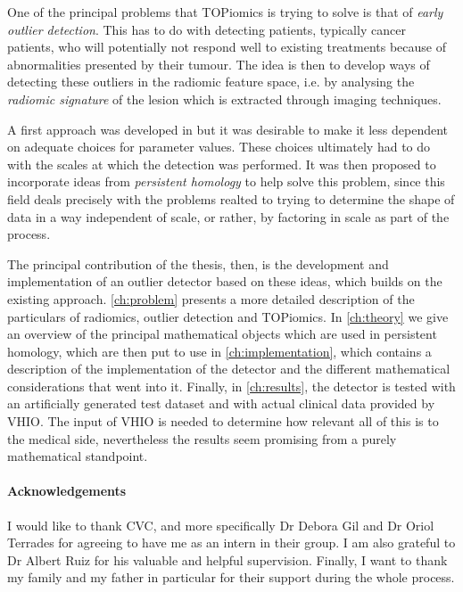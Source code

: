 \documentclass[12pt, oneside]{book}
\begin{document}
One of the principal problems that TOPiomics is trying to solve is that of \emph{early outlier
detection}. This has to do with detecting patients, typically cancer patients, who will
potentially not respond well to existing treatments because of abnormalities presented by
their tumour. The idea is then to develop ways of detecting these outliers in the radiomic
feature space, i.e. by analysing the \emph{radiomic signature} of the lesion which is
extracted through imaging techniques.

A first approach was developed in \cite{topiomics} but it was desirable to make it less
dependent on adequate choices for parameter values. These choices ultimately had to do
with the scales at which the detection was performed. It was then proposed to incorporate
ideas from \emph{persistent homology} to help solve this problem, since this field
deals precisely with the problems realted to trying to determine the shape of data in a
way independent of scale, or rather, by factoring in scale as part of the process. 

The principal contribution of the thesis, then, is the development and implementation of
an outlier detector based on these ideas, which builds on the existing approach.
\cref{ch:problem} presents a more detailed description of the particulars of radiomics,
outlier detection and TOPiomics. In \cref{ch:theory} we give an overview of the principal
mathematical objects which are used in persistent homology, which are then put to use in
\cref{ch:implementation}, which contains a description of the implementation of the
detector and the different mathematical considerations that went into it. Finally, in
\cref{ch:results}, the detector is tested with an artificially generated test dataset and with actual
clinical data provided by VHIO. The input of VHIO is needed to determine how relevant all
of this is to the medical side, nevertheless the results seem promising from a purely
mathematical standpoint.  

\paragraph{Acknowledgements}
I would like to thank CVC, and more specifically Dr Debora Gil and Dr Oriol Terrades for
agreeing to have me as an intern in their group. I am also grateful to Dr Albert Ruiz
for his valuable and helpful supervision. Finally, I want to thank my family and my father
in particular for their support during the whole process. 

\mainmatter
\pagestyle{main}
\end{document}
